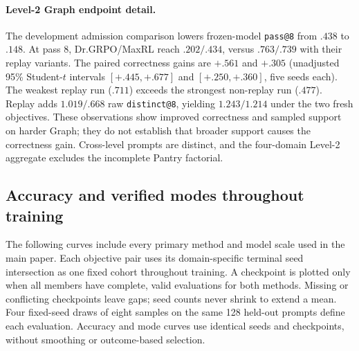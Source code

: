 \documentclass{article}
\newcommand{\1}{\mathbf 1}
\theoremstyle{remark}
\theoremstyle{definition}
\theoremstyle{plain}
\begin{document}
\begin{table}[H]
  \centering
  \caption{\textbf{Fresh-objective effects and replay interactions on Level 2.}
  All three contrasts within a domain use the same four-arm seed
  intersection. The interaction is
  $(\mathrm{ReplayMaxRL}-\mathrm{MaxRL})-
  (\mathrm{ReplayDr.GRPO}-\mathrm{Dr.GRPO})$.
  Each entry gives its mean and, only for a complete five-seed block, a
  paired unadjusted 95\% Student-$t$ interval. Archived four-arm exports:
  \href{https://huggingface.co/od2961/maxent-grpo-models/blob/main/experiments/E119/README.md\#models}{E119 model index}.}
  \label{tab:level2-factorial-contrasts}
  \scriptsize
  \setlength{\tabcolsep}{3pt}
\end{table}


\paragraph{Level-2 Graph endpoint detail.}
\label{app:levels-numerical-detail}
The development admission comparison lowers frozen-model \texttt{pass@8} from $.438$
to $.148$. At pass 8, Dr.GRPO/MaxRL reach $.202/.434$, versus $.763/.739$
with their replay variants. The paired correctness gains are $+.561$ and
$+.305$ (unadjusted 95\% Student-$t$ intervals $[+.445,+.677]$ and
$[+.250,+.360]$, five seeds each). The weakest replay run ($.711$) exceeds
the strongest non-replay run ($.477$). Replay adds $1.019/.668$ raw
\texttt{distinct@8}, yielding $1.243/1.214$ under the two fresh objectives.
These observations show improved correctness and sampled support on harder
Graph; they do not establish that broader support causes the correctness
gain. Cross-level prompts are distinct, and the four-domain Level-2
aggregate excludes the incomplete Pantry factorial.

\subsection{Accuracy and verified modes throughout training}
\label{app:factorial-training-curves}

The following curves include every primary method and model scale used
in the main paper. Each objective pair uses its domain-specific terminal
seed intersection as one fixed cohort throughout training. A checkpoint
is plotted only when all members have complete, valid evaluations for both
methods. Missing or conflicting checkpoints leave gaps; seed counts never
shrink to extend a mean. Four fixed-seed draws of eight samples on the same
128 held-out prompts define each evaluation. Accuracy and mode curves use
identical seeds and checkpoints, without smoothing or outcome-based selection.
\end{document}
